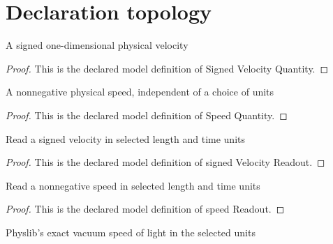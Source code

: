 \section{Declaration topology}
\begin{definition}
  \label{def:physics:phyx-mini-0527:phyxminiproblems-problemphyxmini0527-signedvelocityquantity}
  A signed one-dimensional physical velocity
\end{definition}
\begin{proof}
  This is the declared model definition of Signed Velocity Quantity.
\end{proof}
\begin{definition}
  \label{def:physics:phyx-mini-0527:phyxminiproblems-problemphyxmini0527-speedquantity}
  A nonnegative physical speed, independent of a choice of units
\end{definition}
\begin{proof}
  This is the declared model definition of Speed Quantity.
\end{proof}
\begin{definition}
  \label{def:physics:phyx-mini-0527:phyxminiproblems-problemphyxmini0527-signedvelocityreadout}
  Read a signed velocity in selected length and time units
\end{definition}
\begin{proof}
  This is the declared model definition of signed Velocity Readout.
\end{proof}
\begin{definition}
  \label{def:physics:phyx-mini-0527:phyxminiproblems-problemphyxmini0527-speedreadout}
  Read a nonnegative speed in selected length and time units
\end{definition}
\begin{proof}
  This is the declared model definition of speed Readout.
\end{proof}
\begin{definition}
  \label{def:physics:phyx-mini-0527:phyxminiproblems-problemphyxmini0527-vacuumspeedoflightreadout}
  Physlib's exact vacuum speed of light in the selected units
\end{definition}
